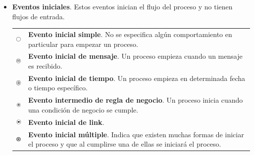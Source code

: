 \begin{itemize}
	\item {\bf Eventos iniciales}. Estos eventos inician el flujo del proceso y no tienen flujos de entrada.

	\begin{tabular}{| m{} m{} | }%
		\rowcolor[gray]{0.97}%
		\centering\noindent\includegraphics[width=18pt]{introduccion/imagenes/procesos/bpmn/StartEvent.png} & {\bf Evento inicial simple}. No se especifica algún comportamiento en particular para empezar un proceso. \\
		\centering\noindent\includegraphics[width=18pt]{introduccion/imagenes/procesos/bpmn/MessageEventStart.png} & {\bf Evento inicial de mensaje}. Un proceso empieza cuando un mensaje es recibido. \\
		\rowcolor[gray]{0.97}%
		\centering\noindent\includegraphics[width=18pt]{introduccion/imagenes/procesos/bpmn/TimerEventStart.png} & {\bf Evento inicial de tiempo}. Un proceso empieza en determinada fecha o tiempo específico. \\
		\centering\noindent\includegraphics[width=18pt]{introduccion/imagenes/procesos/bpmn/RuleEventStart.png} & {\bf Evento intermedio de regla de negocio}. Un proceso inicia cuando una condición de negocio se cumple. \\
		\rowcolor[gray]{0.97}%
		\centering\noindent\includegraphics[width=18pt]{introduccion/imagenes/procesos/bpmn/LinkEventStart.png} & {\bf Evento inicial de link}. \\
		\centering\noindent\includegraphics[width=18pt]{introduccion/imagenes/procesos/bpmn/MultipleEndEvent.png} & {\bf Evento inicial múltiple}. Indica que existen muchas formas de iniciar el proceso y que al cumplirse una de ellas se iniciará el proceso. \\
	\end{tabular}%


\end{itemize}
